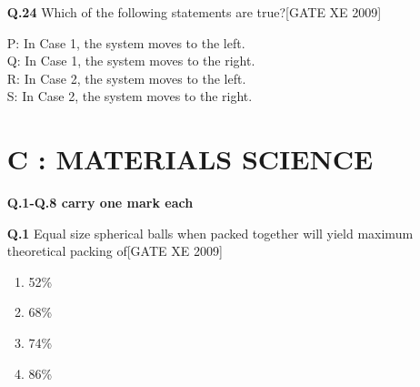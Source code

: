 \documentclass[journal,12pt,onecolumn]{IEEEtran}
\theoremstyle{remark}
\begin{document}
\begin{enumerate}
\begin{enumerate}
\begin{enumerate}
\end{enumerate}
\vspace{0.3cm}

\item[\textbf{Q.24}] Which of the following statements are true?\hfill[GATE XE 2009]

P: In Case 1, the system moves to the left.\\
Q: In Case 1, the system moves to the right.\\
R: In Case 2, the system moves to the left.\\
S: In Case 2, the system moves to the right.
\begin{enumerate}
\end{enumerate}

\vspace{0.5cm}


\clearpage
\section*{C : MATERIALS SCIENCE}





\textbf{Q.1-Q.8 carry one mark each}


\item[\textbf{Q.1}] Equal size spherical balls when packed together will yield maximum theoretical packing of\hfill[GATE XE 2009]

\begin{multicols}{2}
\begin{enumerate}
    \item 52\%
    \item 68\%
    \item 74\%
    \item 86\%
\end{enumerate}
\end{multicols}


\end{enumerate}
\end{enumerate}
\end{document}
